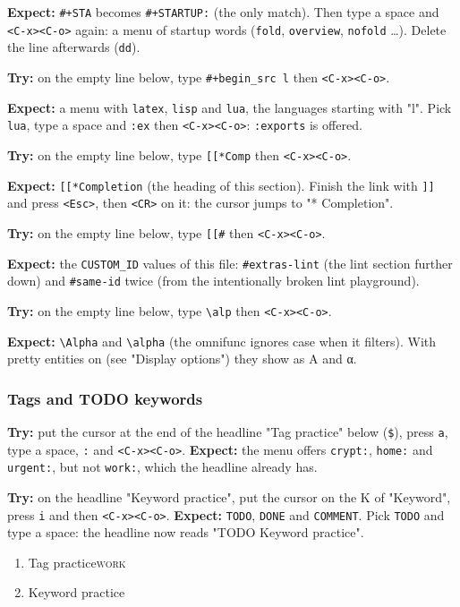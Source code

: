 \textbf{Expect:} \texttt{\#+STA} becomes \texttt{\#+STARTUP:} (the only match). Then type a space
and \texttt{<C-x><C-o>} again: a menu of startup words (\texttt{fold}, \texttt{overview},
\texttt{nofold} \ldots{}). Delete the line afterwards (\texttt{dd}).

\textbf{Try:} on the empty line below, type \texttt{\#+begin\_src l} then \texttt{<C-x><C-o>}.

\textbf{Expect:} a menu with \texttt{latex}, \texttt{lisp} and \texttt{lua}, the
languages starting with "l". Pick \texttt{lua}, type a space and \texttt{:ex} then
\texttt{<C-x><C-o>}: \texttt{:exports} is offered.

\textbf{Try:} on the empty line below, type \texttt{[[*Comp} then \texttt{<C-x><C-o>}.

\textbf{Expect:} \texttt{[[*Completion} (the heading of this section). Finish the link
with \texttt{]]} and press \texttt{<Esc>}, then \texttt{<CR>} on it: the cursor jumps to
"* Completion".

\textbf{Try:} on the empty line below, type \texttt{[[\#} then \texttt{<C-x><C-o>}.

\textbf{Expect:} the \texttt{CUSTOM\_ID} values of this file: \texttt{\#extras-lint} (the lint
section further down) and \texttt{\#same-id} twice (from the intentionally broken
lint playground).

\textbf{Try:} on the empty line below, type \texttt{\textbackslash{}alp} then \texttt{<C-x><C-o>}.

\textbf{Expect:} \texttt{\textbackslash{}Alpha} and \texttt{\textbackslash{}alpha} (the omnifunc ignores case when it
filters). With pretty entities on (see "Display options") they show as Α
and α.
\subsubsection{Tags and TODO keywords}
\label{sec:org22e105b}
\textbf{Try:} put the cursor at the end of the headline "Tag practice" below
(\texttt{\$}), press \texttt{a}, type a space, \texttt{:} and \texttt{<C-x><C-o>}.
\textbf{Expect:} the menu offers \texttt{crypt:}, \texttt{home:} and \texttt{urgent:}, but not
\texttt{work:}, which the headline already has.

\textbf{Try:} on the headline "Keyword practice", put the cursor on the K of
"Keyword", press \texttt{i} and then \texttt{<C-x><C-o>}.
\textbf{Expect:} \texttt{TODO}, \texttt{DONE} and \texttt{COMMENT}. Pick \texttt{TODO} and type a space: the
headline now reads "TODO Keyword practice".
\begin{enumerate}
\item Tag practice\hfill{}\textsc{work}
\label{sec:org4f04a7e}
\item Keyword practice
\label{sec:org2ee9fa0}
\end{enumerate}
